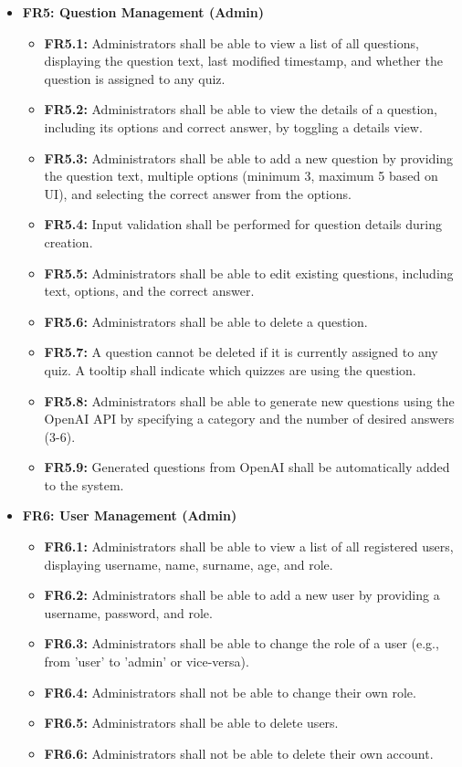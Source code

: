 \begin{itemize}
    \item \textbf{FR5: Question Management (Admin)}
    \begin{itemize}
        \item \textbf{FR5.1:} Administrators shall be able to view a list of all questions, displaying the question text, last modified timestamp, and whether the question is assigned to any quiz.
        \item \textbf{FR5.2:} Administrators shall be able to view the details of a question, including its options and correct answer, by toggling a details view.
        \item \textbf{FR5.3:} Administrators shall be able to add a new question by providing the question text, multiple options (minimum 3, maximum 5 based on UI), and selecting the correct answer from the options.
        \item \textbf{FR5.4:} Input validation shall be performed for question details during creation.
        \item \textbf{FR5.5:} Administrators shall be able to edit existing questions, including text, options, and the correct answer.
        \item \textbf{FR5.6:} Administrators shall be able to delete a question.
        \item \textbf{FR5.7:} A question cannot be deleted if it is currently assigned to any quiz. A tooltip shall indicate which quizzes are using the question.
        \item \textbf{FR5.8:} Administrators shall be able to generate new questions using the OpenAI API by specifying a category and the number of desired answers (3-6).
        \item \textbf{FR5.9:} Generated questions from OpenAI shall be automatically added to the system.
    \end{itemize}

    \item \textbf{FR6: User Management (Admin)}
    \begin{itemize}
        \item \textbf{FR6.1:} Administrators shall be able to view a list of all registered users, displaying username, name, surname, age, and role.
        \item \textbf{FR6.2:} Administrators shall be able to add a new user by providing a username, password, and role.
        \item \textbf{FR6.3:} Administrators shall be able to change the role of a user (e.g., from 'user' to 'admin' or vice-versa).
        \item \textbf{FR6.4:} Administrators shall not be able to change their own role.
        \item \textbf{FR6.5:} Administrators shall be able to delete users.
        \item \textbf{FR6.6:} Administrators shall not be able to delete their own account.
    \end{itemize}


\end{itemize}
